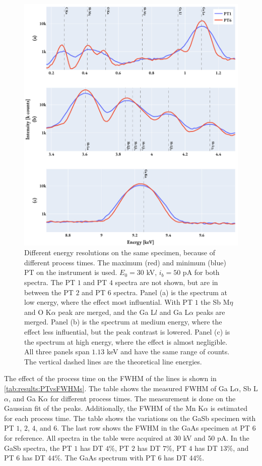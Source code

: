 \begin{figure}[hptb]
    \centering
    \includegraphics[width=0.95\linewidth]{figures/results/eds_energyResolutions_process_time.pdf}
    \caption{
        Different energy resolutions on the same specimen, because of different process times.
        The maximum (red) and minimum (blue) PT on the instrument is used.
        $E_0 = 30$ kV, $i_b = 50$ pA for both spectra.
        The PT $1$ and PT $4$ spectra are not shown, but are in between the PT $2$ and PT $6$ spectra.
        Panel (a) is the spectrum at low energy, where the effect most influential.
        With PT $1$ the Sb M$\eta$ and O K$\alpha$ peak are merged, and the Ga L$l$ and Ga L$\alpha$ peaks are merged.
        Panel (b) is the spectrum at medium energy, where the effect less influential, but the peak contrast is lowered.
        Panel (c) is the spectrum at high energy, where the effect is almost negligible.
        All three panels span $1.13$ keV and have the same range of counts.
        The vertical dashed lines are the theoretical line energies.
    }
    \label{fig:results:energy_resolutions_process_time}
\end{figure}


The effect of the process time on the FWHM of the lines is shown in \cref{tab:results:PTvsFWHMs}.
The table shows the measured FWHM of Ga L$\alpha$, Sb L$\alpha$, and Ga K$\alpha$ for different process times.
The measurement is done on the Gaussian fit of the peaks.
Additionally, the FWHM of the Mn K$\alpha$ is estimated for each process time.
The table shows the variations on the GaSb specimen with PT $1$, $2$, $4$, and $6$.
The last row shows the FWHM in the GaAs specimen at PT $6$ for reference.
All spectra in the table were acquired at $30$ kV and $50$ pA.
In the GaSb spectra, the PT $1$ has DT $4$\%, PT $2$ has DT $7$\%, PT $4$ has DT $13$\%, and PT $6$ has DT $44$\%.
The GaAs spectrum with PT $6$ has DT $44$\%.


